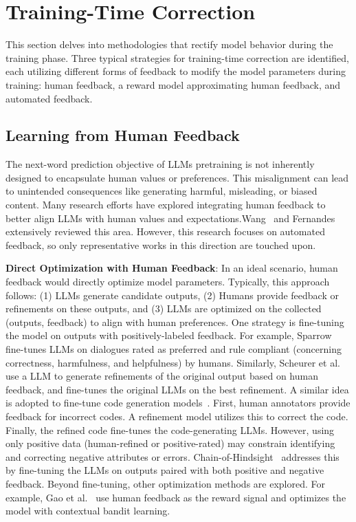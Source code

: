 \documentclass[a4paper,oneside]{book}
\begin{document}
\section{Training-Time Correction}
This section delves into methodologies that rectify model behavior during the training phase. Three typical strategies for training-time correction are identified, each utilizing different forms of feedback to modify the model parameters during training: human feedback, a reward model approximating human feedback, and automated feedback.

\subsection{Learning from Human Feedback}
The next-word prediction objective of LLMs pretraining is not inherently designed to encapsulate human values or preferences. This misalignment can lead to unintended consequences like generating harmful, misleading, or biased content. Many research efforts have explored integrating human feedback to better align LLMs with human values and expectations.Wang~\cite{wang2023aligning} and Fernandes~\cite{fernandes2023bridging} extensively reviewed this area. However, this research focuses on automated feedback, so only representative works in this direction are touched upon.

\textbf{Direct Optimization with Human Feedback}: In an ideal scenario, human feedback would directly optimize model parameters. Typically, this approach follows: (1) LLMs generate candidate outputs, (2) Humans provide feedback or refinements on these outputs, and (3) LLMs are optimized on the collected (outputs, feedback) to align with human preferences. One strategy is fine-tuning the model on outputs with positively-labeled feedback. For example, Sparrow~\cite{glaese2022improving} fine-tunes LLMs on dialogues rated as preferred and rule compliant (concerning correctness, harmfulness, and helpfulness) by humans. Similarly, Scheurer et al.~\cite{scheurer2023training} use a LLM to generate refinements of the original output based on human feedback, and fine-tunes the original LLMs on the best refinement. A similar idea is adopted to fine-tune code generation models~\cite{chen2023improving}. First, human annotators provide feedback for incorrect codes. A refinement model utilizes this to correct the code. Finally, the refined code fine-tunes the code-generating LLMs. However, using only positive data (human-refined or positive-rated) may constrain identifying and correcting negative attributes or errors. Chain-of-Hindsight~\cite{liu2023chain} addresses this by fine-tuning the LLMs on outputs paired with both positive and negative feedback. Beyond fine-tuning, other optimization methods are explored. For example, Gao et al.~\cite{gao2023continually} use human feedback as the reward signal and optimizes the model with contextual bandit learning.
\end{document}
